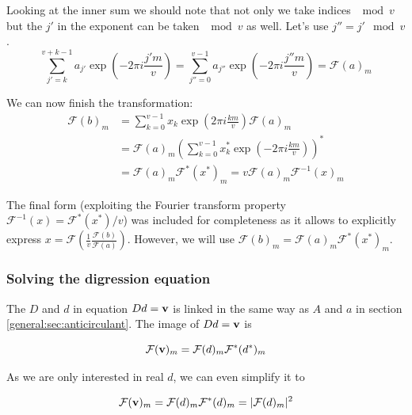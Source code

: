         Looking at the inner sum we should note that not only we take indices $\mod v$ but the $j'$ in the exponent can be taken $\mod v$ as well. Let's use $j'' = j' \mod v$.
        \begin{equation}
            \sum_{j'=k}^{v+k-1} a_{j'} \exp(-2\pi i \frac{j'm}v) = 
            \sum_{j''=0}^{v-1} a_{j''} \exp(-2\pi i \frac{j''m}v) = \mathcal{F}(a)_m
        \end{equation}
        
        We can now finish the transformation:
        \begin{equation}
        \begin{split}
            \mathcal{F} (b)_m
            &= \sum_{k=0}^{v-1} x_k \exp(2\pi i \frac{km}v) \mathcal{F}(a)_m \\
            &= \mathcal{F}(a)_m (\sum_{k=0}^{v-1} x^*_k \exp(-2\pi i \frac{km}v))^* \\
            &= \mathcal{F}(a)_m \mathcal{F}^*(x^*)_m 
            = v \mathcal{F}(a)_m \mathcal{F}^{-1}(x)_m
        \end{split}
        \end{equation}
        
        The final form (exploiting the Fourier transform property $\mathcal{F}^{-1}(x) = \mathcal{F}^*(x^*)/v$) was included for completeness as it allows to explicitly express $x = \mathcal{F} \left(\frac1v \frac{\mathcal{F}(b)}{\mathcal{F}(a)} \right)$. However, we will use $\mathcal{F} (b)_m = \mathcal{F}(a)_m \mathcal{F}^*(x^*)_m$.
    
    \subsubsection{Solving the digression equation}
        The $D$ and $d$ in equation $Dd=\bf v$ is linked in the same way as $A$ and $a$ in section \ref{general:sec:anticirculant}. The image of $Dd=\bf v$ is
        
        \begin{equation}
            \mathcal{F} ({\bf v})_m = \mathcal{F}(d)_m \mathcal{F^*}(d^*)_m
        \end{equation}

        As we are only interested in real $d$, we can even simplify it to
        
        \begin{equation}
            \label{general:eq:dfourier}
            \mathcal{F} ({\bf v})_m = \mathcal{F}(d)_m \mathcal{F^*}(d)_m = |\mathcal{F}(d)_m|^2
        \end{equation}
        
